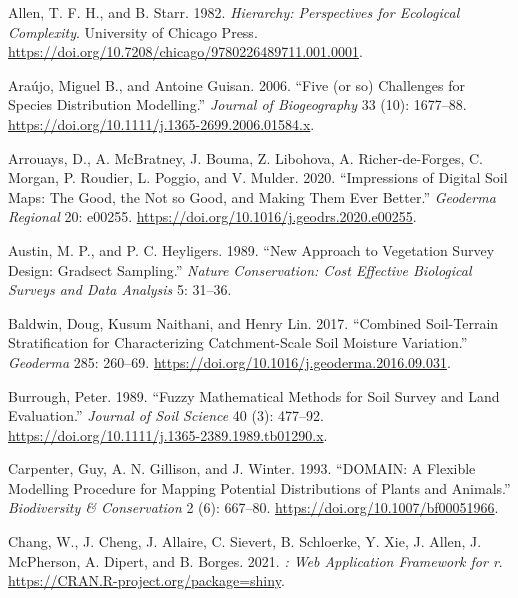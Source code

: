 \hypertarget{refs}{}
\begin{CSLReferences}{1}{0}
\leavevmode{}%
Allen, T. F. H., and B. Starr. 1982. \emph{Hierarchy: Perspectives for Ecological Complexity}. University of Chicago Press. \url{https://doi.org/10.7208/chicago/9780226489711.001.0001}.

\leavevmode{}%
Araújo, Miguel B., and Antoine Guisan. 2006. {``Five (or so) Challenges for Species Distribution Modelling.''} \emph{Journal of Biogeography} 33 (10): 1677--88. \url{https://doi.org/10.1111/j.1365-2699.2006.01584.x}.

\leavevmode{}%
Arrouays, D., A. McBratney, J. Bouma, Z. Libohova, A. Richer-de-Forges, C. Morgan, P. Roudier, L. Poggio, and V. Mulder. 2020. {``Impressions of Digital Soil Maps: The Good, the Not so Good, and Making Them Ever Better.''} \emph{Geoderma Regional} 20: e00255. \url{https://doi.org/10.1016/j.geodrs.2020.e00255}.

\leavevmode{}%
Austin, M. P., and P. C. Heyligers. 1989. {``New Approach to Vegetation Survey Design: Gradsect Sampling.''} \emph{Nature Conservation: Cost Effective Biological Surveys and Data Analysis} 5: 31--36.

\leavevmode{}%
Baldwin, Doug, Kusum Naithani, and Henry Lin. 2017. {``Combined Soil-Terrain Stratification for Characterizing Catchment-Scale Soil Moisture Variation.''} \emph{Geoderma} 285: 260--69. \url{https://doi.org/10.1016/j.geoderma.2016.09.031}.

\leavevmode{}%
Burrough, Peter. 1989. {``Fuzzy Mathematical Methods for Soil Survey and Land Evaluation.''} \emph{Journal of Soil Science} 40 (3): 477--92. \url{https://doi.org/10.1111/j.1365-2389.1989.tb01290.x}.

\leavevmode{}%
Carpenter, Guy, A. N. Gillison, and J. Winter. 1993. {``{DOMAIN}: A Flexible Modelling Procedure for Mapping Potential Distributions of Plants and Animals.''} \emph{Biodiversity \& Conservation} 2 (6): 667--80. \url{https://doi.org/10.1007/bf00051966}.

\leavevmode{}%
Chang, W., J. Cheng, J. Allaire, C. Sievert, B. Schloerke, Y. Xie, J. Allen, J. McPherson, A. Dipert, and B. Borges. 2021. \emph{: Web Application Framework for r}. \url{https://CRAN.R-project.org/package=shiny}.


\end{CSLReferences}
